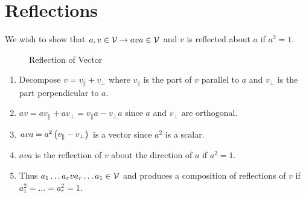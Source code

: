 \section{Reflections}
We wish to show that $a,v \in \mathcal{V} \rightarrow ava \in \mathcal{V}$ and $v$ is reflected about $a$ if
$a^{2} = 1$.
\begin{figure}[htbp]
\begin{center}
\caption{Reflection of Vector}
\end{center}
\end{figure}
\begin{enumerate}
\item Decompose $v = v_{\parallel}+v_{\perp}$ where $v_{\parallel}$ is the part of $v$
parallel to $a$ and $v_{\perp}$ is the part perpendicular to $a$.
\item $av = av_{\parallel}+av_{\perp} = v_{\parallel}a-v_{\perp}a$ since $a$ and $v_{\perp}$ are
orthogonal.
\item $ava = a^{2}\left ( v_{\parallel}-v_{\perp}\right )$ is a vector since $a^{2}$ is a scalar.
\item $ava$ is the reflection of $v$ about the direction of $a$ if $a^{2} = 1$.
\item Thus ${a_{1}}\dots{a_{r}}v{a_{r}}\dots{a_{1}} \in \mathcal{V}$ and produces a composition of reflections
of $v$ if $a^{2}_{1} = \dots = a^{2}_{r} = 1$.
\end{enumerate}

